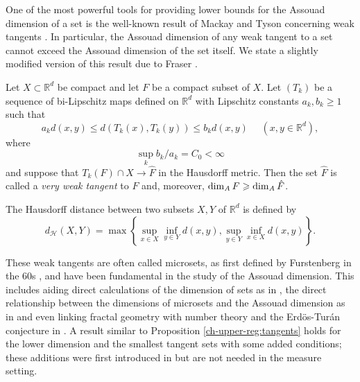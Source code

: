 One of the most powerful tools for providing lower bounds for the Assouad dimension of a set is the well-known result of Mackay and Tyson concerning weak tangents \cite[Proposition 6.1.5]{mackaytyson}. In particular, the Assouad dimension of any weak tangent to a set cannot exceed the Assouad dimension of the set itself. We state a slightly modified version of this result due to Fraser \cite[Proposition 7.7]{Fr}. 
\begin{proposition}\label{ch-upper-reg:tangents}
Let $X\subset \mathbb{R}^d$ be compact and let $F$ be a compact subset of $X$. Let $(T_k)$ be a sequence of bi-Lipschitz maps defined on $\mathbb{R}^d$ with Lipschitz constants $a_k, b_k \ge 1$ such that 
\[
a_k d(x,y) \leq d( T_k(x) , T_k(y) ) \leq b_k d( x, y)  \,\,\,\,\,\,\,\, (x,y\in\mathbb{R}^d),
\]
where
\[
\sup_k b_k / a_k = C_0 <\infty
\]
and suppose that $T_k(F) \cap X \rightarrow \hat{F}$ in the Hausdorff metric. Then the set $\hat F$ is called a \emph{very weak tangent} to $F$ and, moreover,  $\dim_{\text{\emph{A}}} F \geq \dim_{\text{\emph{A}}} \hat{F}$.
\end{proposition}
The Hausdorff distance between two subsets $X,Y$ of $\mathbb{R}^d$ is defined by
\[
d_{\mathcal{H}}(X,Y) = \max\left\{\sup_{x\in X} \inf_{y \in Y} d(x,y), \sup_{y\in Y} \inf_{x \in X} d(x,y)\right\}.
\]


These weak tangents are often called microsets, as first defined by Furstenberg in the 60s \cite{furstenberg70, furstenberg}, and have been fundamental in the study of the Assouad dimension. This includes aiding direct calculations of the dimension of sets as in \cite{fraser-howroyd1}, the direct relationship between the dimensions of microsets and the Assouad dimension as in \cite{kaenmaki-assouad, microsets} and even linking fractal geometry with number theory and the Erd\"os-Tur\'an conjecture in \cite{FY}. A result similar to Proposition \ref{ch-upper-reg:tangents} holds for the lower dimension and the smallest tangent sets with some added conditions; these additions were first introduced in \cite{Fr} but are not needed in the measure setting.


